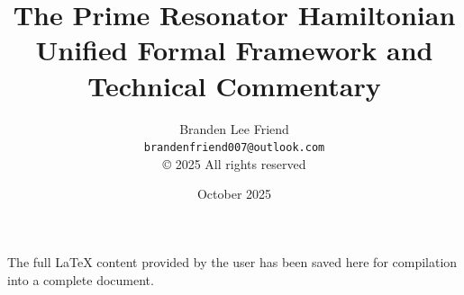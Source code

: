 \documentclass[11pt,reqno]{article}
\title{\Large\bfseries The Prime Resonator Hamiltonian\\
\large Unified Formal Framework and Technical Commentary}
\author{Branden Lee Friend\\\texttt{brandenfriend007@outlook.com}\\[6pt] \small © 2025 All rights reserved}
\date{October 2025}
\theoremstyle{plain}
\theoremstyle{definition}
\theoremstyle{remark}
\begin{document}
The full LaTeX content provided by the user has been saved here for compilation into a complete document.
\end{document}
